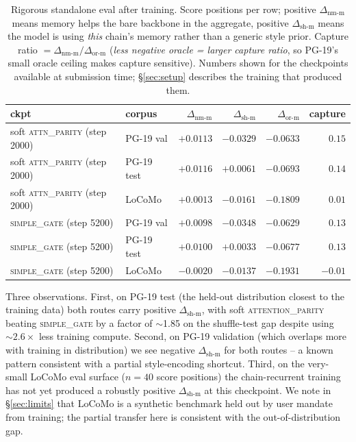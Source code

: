 \documentclass{article}
\newcommand{\dnm}{\Delta_{\text{nm-m}}}
\newcommand{\dsh}{\Delta_{\text{sh-m}}}
\newcommand{\dor}{\Delta_{\text{or-m}}}
\begin{document}
\begin{table}[t]
\centering
\caption{Rigorous standalone eval after training. Score positions
per row; positive $\dnm$ means memory helps the bare backbone in the
aggregate, positive $\dsh$ means the model is using \emph{this} chain's
memory rather than a generic style prior. Capture ratio $= \dnm / \dor$
(\textit{less negative oracle = larger capture ratio}, so PG-19's small
oracle ceiling makes capture sensitive). Numbers shown for the
checkpoints available at submission time; \S\ref{sec:setup} describes
the training that produced them.}
\label{tab:standalone}
\small
\begin{tabular}{llrrrr}
\toprule
ckpt & corpus & $\dnm$ & $\dsh$ & $\dor$ & capture \\
\midrule
  soft \textsc{attn\_parity} (step 2000) & PG-19 val & $+0.0113$ & $-0.0329$ & $-0.0633$ & $0.15$ \\
  soft \textsc{attn\_parity} (step 2000) & PG-19 test & $+0.0116$ & $+0.0061$ & $-0.0693$ & $0.14$ \\
  soft \textsc{attn\_parity} (step 2000) & LoCoMo & $+0.0013$ & $-0.0161$ & $-0.1809$ & $0.01$ \\
  \midrule
  \textsc{simple\_gate} (step 5200) & PG-19 val & $+0.0098$ & $-0.0348$ & $-0.0629$ & $0.13$ \\
  \textsc{simple\_gate} (step 5200) & PG-19 test & $+0.0100$ & $+0.0033$ & $-0.0677$ & $0.13$ \\
  \textsc{simple\_gate} (step 5200) & LoCoMo & $-0.0020$ & $-0.0137$ & $-0.1931$ & $-0.01$ \\
\bottomrule
\end{tabular}
\end{table}

Three observations.
First, on PG-19 test (the held-out distribution closest to the training
data) both routes carry positive $\dsh$, with soft \textsc{attention\_parity}
beating \textsc{simple\_gate} by a factor of $\sim$1.85 on the
shuffle-test gap despite using $\sim 2.6\times$ less training compute.
Second, on PG-19 validation (which overlaps more with training in
distribution) we see negative $\dsh$ for both routes -- a known
pattern consistent with a partial style-encoding shortcut.
Third, on the very-small LoCoMo eval surface ($n = 40$ score positions)
the chain-recurrent training has not yet produced a robustly
positive $\dsh$ at this checkpoint. We note in \S\ref{sec:limits}
that LoCoMo is a synthetic benchmark held out by user mandate from
training; the partial transfer here is consistent with the
out-of-distribution gap.
\end{document}
